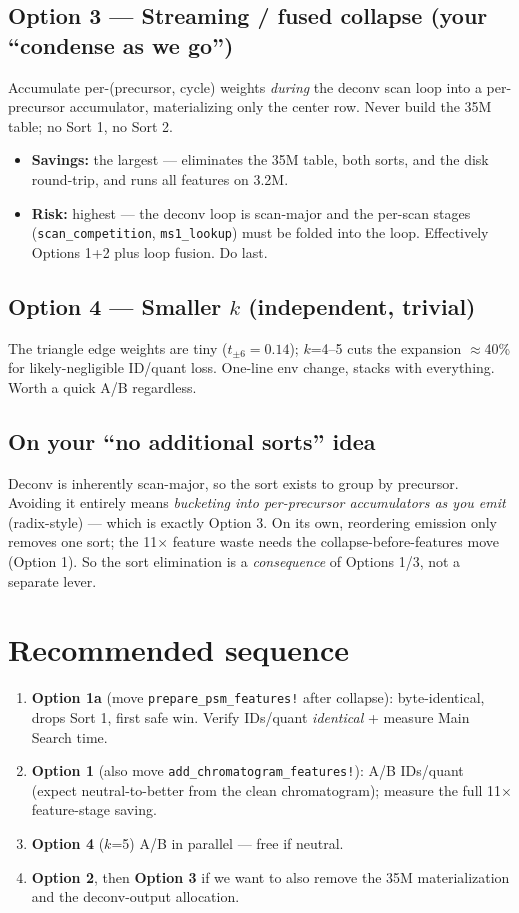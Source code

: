 \documentclass[11pt]{article}
\newcommand{\code}[1]{\texttt{\small #1}}
\begin{document}
\subsection*{Option 3 --- Streaming / fused collapse (your ``condense as we go'')}
Accumulate per-(precursor, cycle) weights \emph{during} the deconv scan loop into a
per-precursor accumulator, materializing only the center row. Never build the 35M
table; no Sort 1, no Sort 2.
\begin{itemize}
\item \textbf{Savings:} the largest --- eliminates the 35M table, both sorts, and the
disk round-trip, and runs all features on 3.2M.
\item \textbf{Risk:} highest --- the deconv loop is scan-major and the per-scan stages
(\code{scan\_competition}, \code{ms1\_lookup}) must be folded into the loop. Effectively
Options 1+2 plus loop fusion. Do last.
\end{itemize}

\subsection*{Option 4 --- Smaller $k$ (independent, trivial)}
The triangle edge weights are tiny ($t_{\pm6}=0.14$); $k$=4--5 cuts the expansion
$\approx$40\% for likely-negligible ID/quant loss. One-line env change, stacks with
everything. Worth a quick A/B regardless.

\subsection*{On your ``no additional sorts'' idea}
Deconv is inherently scan-major, so the sort exists to group by precursor. Avoiding it
entirely means \emph{bucketing into per-precursor accumulators as you emit}
(radix-style) --- which is exactly Option 3. On its own, reordering emission only
removes one sort; the 11$\times$ feature waste needs the collapse-before-features move
(Option 1). So the sort elimination is a \emph{consequence} of Options 1/3, not a
separate lever.

\section{Recommended sequence}

\begin{enumerate}
\item \textbf{Option 1a} (move \code{prepare\_psm\_features!} after collapse):
byte-identical, drops Sort 1, first safe win. Verify IDs/quant \emph{identical} +
measure Main Search time.
\item \textbf{Option 1} (also move \code{add\_chromatogram\_features!}): A/B IDs/quant
(expect neutral-to-better from the clean chromatogram); measure the full 11$\times$
feature-stage saving.
\item \textbf{Option 4} ($k$=5) A/B in parallel --- free if neutral.
\item \textbf{Option 2}, then \textbf{Option 3} if we want to also remove the 35M
materialization and the deconv-output allocation.
\end{enumerate}
\end{document}
